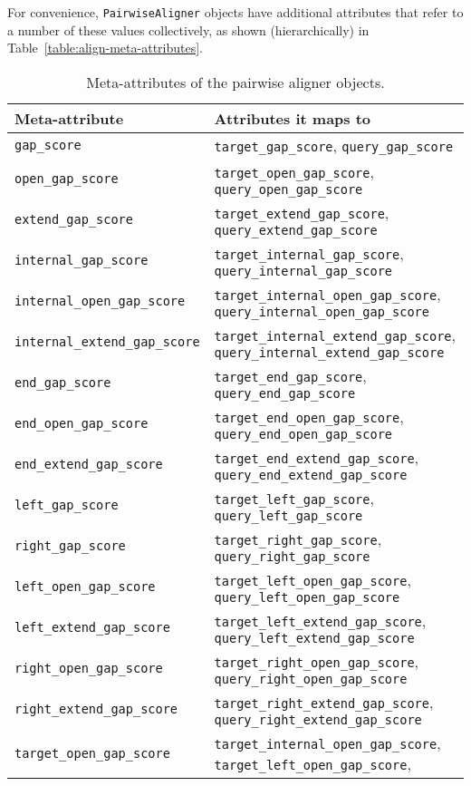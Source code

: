 For convenience, \verb+PairwiseAligner+ objects have additional attributes that refer to a number of these values collectively, as shown (hierarchically) in Table~\ref{table:align-meta-attributes}.

\begin{table}
\caption{Meta-attributes of the pairwise aligner objects.}
\begin{tabular}{|l|l|}
\hline
\bf{Meta-attribute} & \bf{Attributes it maps to} \\
\hline
\verb+gap_score+ & \verb+target_gap_score+, \verb+query_gap_score+ \\
\verb+open_gap_score+ & \verb+target_open_gap_score+, \verb+query_open_gap_score+ \\
\verb+extend_gap_score+ & \verb+target_extend_gap_score+, \verb+query_extend_gap_score+ \\
\verb+internal_gap_score+ & \verb+target_internal_gap_score+, \verb+query_internal_gap_score+ \\
\verb+internal_open_gap_score+ & \verb+target_internal_open_gap_score+, \verb+query_internal_open_gap_score+ \\
\verb+internal_extend_gap_score+ & \verb+target_internal_extend_gap_score+, \verb+query_internal_extend_gap_score+ \\
\verb+end_gap_score+ & \verb+target_end_gap_score+, \verb+query_end_gap_score+ \\
\verb+end_open_gap_score+ & \verb+target_end_open_gap_score+, \verb+query_end_open_gap_score+ \\
\verb+end_extend_gap_score+ & \verb+target_end_extend_gap_score+, \verb+query_end_extend_gap_score+ \\
\verb+left_gap_score+ & \verb+target_left_gap_score+, \verb+query_left_gap_score+ \\
\verb+right_gap_score+ & \verb+target_right_gap_score+, \verb+query_right_gap_score+ \\
\verb+left_open_gap_score+ & \verb+target_left_open_gap_score+, \verb+query_left_open_gap_score+ \\
\verb+left_extend_gap_score+ & \verb+target_left_extend_gap_score+, \verb+query_left_extend_gap_score+ \\
\verb+right_open_gap_score+ & \verb+target_right_open_gap_score+, \verb+query_right_open_gap_score+ \\
\verb+right_extend_gap_score+ & \verb+target_right_extend_gap_score+, \verb+query_right_extend_gap_score+ \\
\verb+target_open_gap_score+ & \verb+target_internal_open_gap_score+, \verb+target_left_open_gap_score+, \\

\end{tabular}
\end{table}
